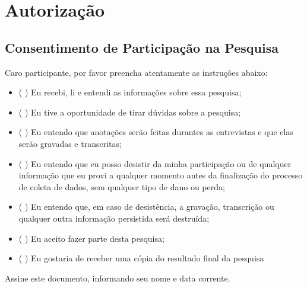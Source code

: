 \chapter{Autorização}
\label{ape:autorizacao}

\section{Consentimento de Participação na Pesquisa}

Caro participante, por favor preencha atentamente as instruções abaixo:

\begin{itemize}
  \item (  ) Eu recebi, li e entendi as informações sobre essa pesquisa;
  \item (  ) Eu tive a oportunidade de tirar dúvidas sobre a pesquisa;
  \item (  ) Eu entendo que anotações serão feitas durantes as entrevistas e que
  elas serão gravadas e transcritas;
  \item (  ) Eu entendo que eu posso desistir da minha participação ou de
  qualquer informação que eu provi a qualquer momento antes da finalização do processo de
  coleta de dados, sem qualquer tipo de dano ou perda;
  \item (  ) Eu entendo que, em caso de desistência, a gravação, transcrição ou
  qualquer outra informação persistida será destruída;
  \item (  ) Eu aceito fazer parte desta pesquisa;
  \item (  ) Eu gostaria de receber uma cópia do resultado final da pesquisa
\end{itemize}

Assine este documento, informando seu nome e data corrente.